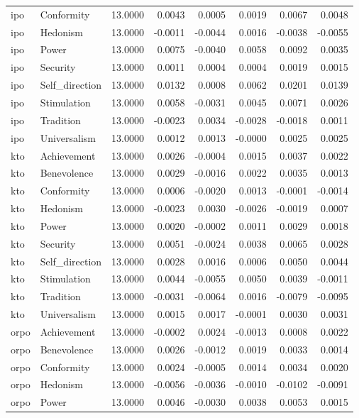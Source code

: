 \begin{tabular}{llrrrrrr}
ipo & Conformity & 13.0000 & 0.0043 & 0.0005 & 0.0019 & 0.0067 & 0.0048 \\
ipo & Hedonism & 13.0000 & -0.0011 & -0.0044 & 0.0016 & -0.0038 & -0.0055 \\
ipo & Power & 13.0000 & 0.0075 & -0.0040 & 0.0058 & 0.0092 & 0.0035 \\
ipo & Security & 13.0000 & 0.0011 & 0.0004 & 0.0004 & 0.0019 & 0.0015 \\
ipo & Self\_direction & 13.0000 & 0.0132 & 0.0008 & 0.0062 & 0.0201 & 0.0139 \\
ipo & Stimulation & 13.0000 & 0.0058 & -0.0031 & 0.0045 & 0.0071 & 0.0026 \\
ipo & Tradition & 13.0000 & -0.0023 & 0.0034 & -0.0028 & -0.0018 & 0.0011 \\
ipo & Universalism & 13.0000 & 0.0012 & 0.0013 & -0.0000 & 0.0025 & 0.0025 \\
kto & Achievement & 13.0000 & 0.0026 & -0.0004 & 0.0015 & 0.0037 & 0.0022 \\
kto & Benevolence & 13.0000 & 0.0029 & -0.0016 & 0.0022 & 0.0035 & 0.0013 \\
kto & Conformity & 13.0000 & 0.0006 & -0.0020 & 0.0013 & -0.0001 & -0.0014 \\
kto & Hedonism & 13.0000 & -0.0023 & 0.0030 & -0.0026 & -0.0019 & 0.0007 \\
kto & Power & 13.0000 & 0.0020 & -0.0002 & 0.0011 & 0.0029 & 0.0018 \\
kto & Security & 13.0000 & 0.0051 & -0.0024 & 0.0038 & 0.0065 & 0.0028 \\
kto & Self\_direction & 13.0000 & 0.0028 & 0.0016 & 0.0006 & 0.0050 & 0.0044 \\
kto & Stimulation & 13.0000 & 0.0044 & -0.0055 & 0.0050 & 0.0039 & -0.0011 \\
kto & Tradition & 13.0000 & -0.0031 & -0.0064 & 0.0016 & -0.0079 & -0.0095 \\
kto & Universalism & 13.0000 & 0.0015 & 0.0017 & -0.0001 & 0.0030 & 0.0031 \\
orpo & Achievement & 13.0000 & -0.0002 & 0.0024 & -0.0013 & 0.0008 & 0.0022 \\
orpo & Benevolence & 13.0000 & 0.0026 & -0.0012 & 0.0019 & 0.0033 & 0.0014 \\
orpo & Conformity & 13.0000 & 0.0024 & -0.0005 & 0.0014 & 0.0034 & 0.0020 \\
orpo & Hedonism & 13.0000 & -0.0056 & -0.0036 & -0.0010 & -0.0102 & -0.0091 \\
orpo & Power & 13.0000 & 0.0046 & -0.0030 & 0.0038 & 0.0053 & 0.0015 \\

\end{tabular}
